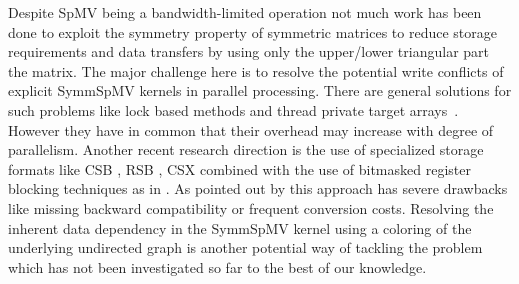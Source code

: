 


Despite \acrshort{SpMV} being a bandwidth-limited operation not much work has 
been done to exploit the symmetry property of symmetric matrices to reduce
storage requirements and data transfers by using only the upper/lower triangular part the matrix.
The major challenge here is to resolve the potential write conflicts of explicit \acrshort{SymmSpMV} kernels in parallel processing.
There are general solutions for such problems like 
lock based methods and thread private target
arrays~\cite{sparseX,thread_private_symm_spmv,Krotkiewski:2010:PSS:1752612.1752682,Mironowicz:2015}. However they have in common that their overhead may increase with degree of parallelism.
Another recent research direction is the use of specialized storage formats 
like CSB \cite{CSB}, RSB \cite{RSB}, CSX \cite{sparseX} combined with the use of bitmasked 
register blocking techniques as in \cite{Buluc:2011:RMA:2058524.2059503}. As pointed out 
by \cite{liu2015spmv} this approach has severe drawbacks like missing backward compatibility or frequent conversion costs.  
Resolving the inherent data dependency in the \acrshort{SymmSpMV} kernel using a \DTWO coloring of the underlying undirected graph is another potential way of tackling the problem which has not been investigated so far to the best of our knowledge. 

